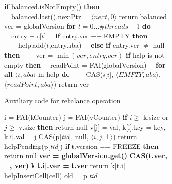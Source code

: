 \begin{figure}[h!]
\begin{center}
\begin{minipage}[b]{0.48\textwidth}
\begin{subfigure}[b]{\textwidth}
\begin{algorithmic}[1]{}
		\State \textbf{if} balanced.isNotEmpty() \textbf{then}
		\Statex {}
		\State \ \ balanced.last().nextPtr = $\langle next,0\rangle$  
		\State return balanced
		\EndFunction
		\Statex 
		\State ver = globalVersion 
		\State \textbf{for} $t=0\ldots \#threads-1$ \textbf{do}
		\State \ \ entry = s[$t$]
		\State \ \ \textbf{if} entry.ver == EMPTY \textbf{then}
		\State \ \ \ \ help.add($t$,entry.aba) 
		\State \ \ \textbf{else if} entry.ver $\neq$ null \textbf{then}
		\State \ \ \ \ ver = $\min(ver,entry.ver)$
		\State \textbf{if} help is not empty \textbf{then}
		\State \ \ readPoint = FAI(globalVersion) 
		\State \ \ \textbf{for all}  $\langle i,aba\rangle$ in help \textbf{do}
		\State \ \ \ \ CAS(s[$i$],  $\langle EMPTY,aba\rangle$, $\langle readPoint,aba\rangle$) %
		\State return ver
		\EndFunction
		\end{algorithmic}
\caption{Auxiliary code for rebalance operation} \label{fig:freeze}
	\end{subfigure}
\vfill
\end{minipage}
\hspace{0.02\textwidth}
\begin{minipage}[b]{0.48\textwidth}
	\begin{subfigure}[b]{\textwidth}
		\begin{algorithmic}[1]{}
		\State i = FAI(kCounter) 
		\State j = FAI(vCounter) 
		\State \textbf{if} $i \geq$ k.size or $j \geq$ v.size \textbf{then} return null %
		\State v[j] = val, k[i].key = key, k[i].val = j %
		\State CAS(p[\textit{tid}], null, $\langle i, j, \bot\rangle$) %
		\State return helpPending(p[\textit{tid}])
		\EndFunction
		\Statex 
		\State \textbf{if} t.version == FREEZE \textbf{then} return null %
		\State \textbf{\color{blue}ver = globalVersion.get()}
		\State \textbf{\color{blue}CAS(t.ver, $\bot$, ver)}
		\State \textbf{\color{blue}k[t.i].ver = t.ver}
		\State return k[t.i] 
		\EndFunction
		\Statex 
		\State helpInsertCell(cell)
		\State old = p[\textit{tid}]

\end{algorithmic}
\end{subfigure}
\end{minipage}
\end{center}
\end{figure}

